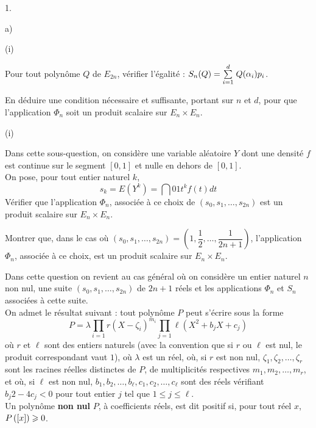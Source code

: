 \documentclass[11pt]{article}%
\begin{document}
\begin{noliste}{1.}
\begin{noliste}{a)}
\begin{nonoliste}{(i)}
\item Pour tout polynôme $Q$ de $E_{2n}$, vérifier l'égalité :
$S_{n}(Q) = {\textstyle\sum\limits_{i = 1}^{d}}\hspace{.1cm}Q(\alpha_{i})p_{i}$.

\item En déduire une condition nécessaire et suffisante, portant sur
$n$ et $d$, pour que l'application $\Phi_{n}$ soit un produit scalaire
sur $E_{n}\times E_{n}$.
\end{nonoliste}

\item 

\begin{nonoliste}{(i)}
\item Dans cette sous-question, on considère une variable aléatoire $Y$
dont
une densité $f$ est continue sur le segment $[0,1]$ et nulle en dehors
de $[0,1]$.\\
On pose, pour tout entier naturel $k$,
\[
s_{k} = E(Y^{k}) = \dint{0}{1}t^{k}f(t)dt
\]
Vérifier que l'application $\Phi_{n}$, associée à ce choix de
$(s_{0},s_{1},\dots,s_{2n})$ est un produit scalaire sur $E_{n}\times
E_{n}$.

\item Montrer que, dans le cas où $(s_{0},s_{1},\dots,s_{2n}) =
(1,\dfrac{1}{2},\dots,\dfrac{1}{2n + 1})$, l'application $\Phi_{n}$,
associée à ce choix,
est un produit scalaire sur $E_{n}\times E_{n}$.
\end{nonoliste}
\end{noliste}

\item Dans cette question on revient au cas général où on considère un
entier naturel $n$ non nul, une suite $(s_{0},s_{1},\dots,s_{2n})$ de
$2n + 1$
réels et les applications $\Phi_{n}$ et $S_{n}$ associées à cette
suite.\\
On admet le résultat suivant : tout polynôme $P$ peut s'écrire sous la
forme
\[
P = \lambda \prod_{i = 1}{r}(X-\zeta_{i})^{m_{i}}\prod_{j = 1}{\ell
}(X^{2} + b_{j}X + c_{j})
\]
où $r$ et $\ell $ sont des entiers naturels (avec la convention que si
$r$
ou $\ell $ est nul, le produit correspondant vaut $1$), où $\lambda $
est un
réel, où, si $r$ est non nul, $\zeta_{1},\zeta_{2},\dots,\zeta_{r}$
sont
les racines réelles distinctes de $P$, de multiplicités respectives
$m_{1},m_{2},\dots,m_{r}$, et où, si $\ell $ est non nul,
$b_{1},b_{2},\dots,b_{\ell },c_{1},c_{2},\dots,c_{\ell }$ sont des
réels vérifiant $b_{j}{2}-4c_{j}<0$ pour tout entier $j$ tel que $1\leq
j\leq \ell $.\\
 Un polynôme \textbf{non nul} $P$, à
coefficients réels, est dit positif si, pour tout réel $x$,
$P\left(\left[ {x} \right]\right)\geqslant 0$.


\end{noliste}
\end{document}
